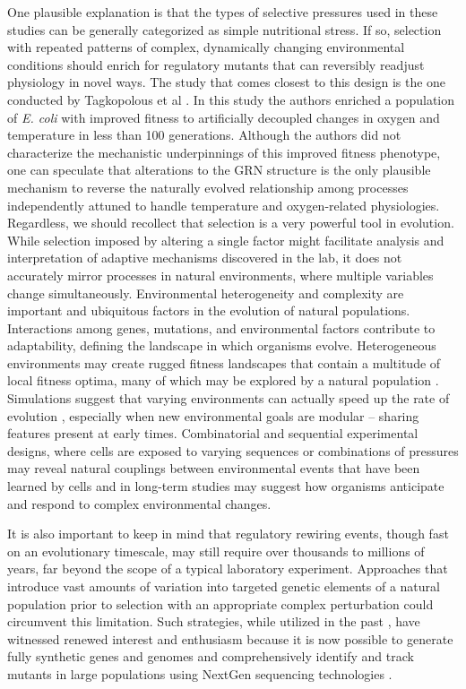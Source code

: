 One plausible explanation is that the types of selective pressures used in these studies can be generally categorized as simple nutritional stress. If so, selection with repeated patterns of complex, dynamically changing environmental conditions should enrich for regulatory mutants that can reversibly readjust physiology in novel ways.  The study that comes closest to this design is the one conducted by Tagkopolous et al \cite{tagkopoulos_predictive_2008}. In this study the authors enriched a population of \textit{E. coli} with improved fitness to artificially decoupled changes in oxygen and temperature in less than 100 generations. Although the authors did not characterize the mechanistic underpinnings of this improved fitness phenotype, one can speculate that alterations to the GRN structure is the only plausible mechanism to reverse the naturally evolved relationship among processes independently attuned to handle temperature and oxygen-related physiologies. Regardless, we should recollect that selection is a very powerful tool in evolution. While selection imposed by altering a single factor might facilitate analysis and interpretation of adaptive mechanisms discovered in the lab, it does not accurately mirror processes in natural environments, where multiple variables change simultaneously. Environmental heterogeneity and complexity are important and ubiquitous factors in the evolution of natural populations. Interactions among genes, mutations, and environmental factors contribute to adaptability, defining the landscape in which organisms evolve. Heterogeneous environments may create rugged fitness landscapes that contain a multitude of local fitness optima, many of which may be explored by a natural population \cite{cooper_experimental_2010}. Simulations suggest that varying environments can actually speed up the rate of evolution \cite{kashtan_varying_2007}, especially when new environmental goals are modular – sharing features present at early times. Combinatorial and sequential experimental designs, where cells are exposed to varying sequences or combinations of pressures may reveal natural couplings between environmental events that have been learned by cells \cite{baliga_systems_2008} and in long-term studies may suggest how organisms anticipate and respond to complex environmental changes.

It is also important to keep in mind that regulatory rewiring events, though fast on an evolutionary timescale, may still require over thousands to millions of years, far beyond the scope of a typical laboratory experiment.  Approaches that introduce vast amounts of variation into targeted genetic elements of a natural population prior to selection with an appropriate complex perturbation could circumvent this limitation.  Such strategies, while utilized in the past \cite{wang_programming_2009}, have witnessed renewed interest and enthusiasm because it is now possible to generate fully synthetic genes and genomes \cite{gibson_creation_2010} and comprehensively identify and track mutants in large populations using NextGen sequencing technologies \cite{margulies_genome_2005}.  

